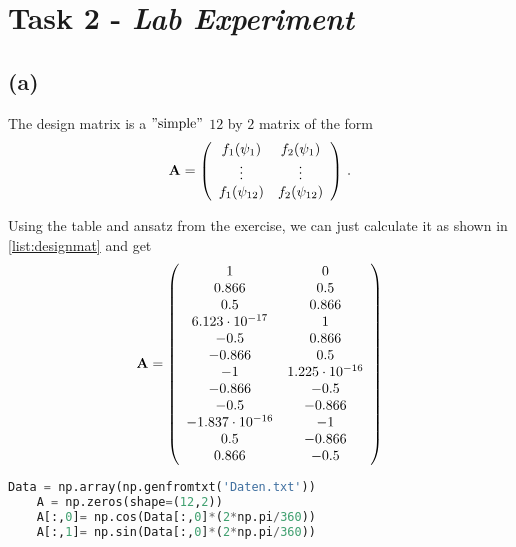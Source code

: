 \section{Task 2 - \textit{Lab Experiment}}

\subsection*{(a)}

The design matrix is a $"\text{simple}"$ $12$ by $2$ matrix of the form
\begin{equation*}
    \textbf{A} = \left(
        \begin{array}{c c}
            f_1(\psi_1) & f_2(\psi_1) \\
            \vdots & \vdots \\
            f_1(\psi_{12}) & f_2(\psi_{12}) \\
        \end{array}
    \right) \,.
\end{equation*}

Using the table and ansatz from the exercise, we can just calculate it as shown in \autoref{list:designmat} and get
\begin{equation*}
    \textbf{A} = \left(
        \begin{array}{c c}
             1                    &  0  \\
             0.866                &  0.5 \\
             0.5                  &  0.866 \\
             6.123 \cdot 10^{-17}  &  1 \\
            -0.5                  &  0.866 \\
            -0.866                &  0.5 \\
            -1                    &  1.225 \cdot 10^{-16} \\
            -0.866                & -0.5 \\
            -0.5                  & -0.866 \\
            -1.837 \cdot 10^{-16} & -1 \\
            0.5                   & -0.866 \\
            0.866                 & -0.5 \\
        \end{array}
    \right)
\end{equation*}

\begin{lstlisting}[language = Python, caption={Calculation of design matrix \textbf{A}.}, label = {list:designmat}]
    Data = np.array(np.genfromtxt('Daten.txt'))
    A = np.zeros(shape=(12,2))
    A[:,0]= np.cos(Data[:,0]*(2*np.pi/360))
    A[:,1]= np.sin(Data[:,0]*(2*np.pi/360))
\end{lstlisting}


